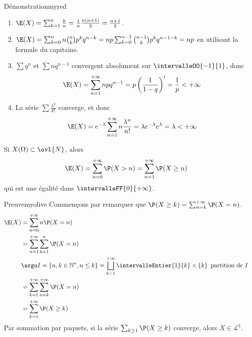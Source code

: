     \begin{omed}{Démonstration}{myred}
        \begin{enumerate}
            \item $\E(X) = \sum_{k=1}^n \frac{k}{n} = \frac{1}{n} \frac{n(n+1)}{2} = \frac{n+1}{2}$.
            \item $\E(X) = \sum_{k=0}^n n \binom{n}{k} p^k q^{n-k} = np \sum_{k=0}^{n-1} \binom{n-1}{k} p^k q^{n-1-k} = np$ en utilisant la formule du capitaine.
            \item $\sum q^n$ et $\sum n q^{n-1}$ convergent absolument sur $\intervalleOO{-1}{1}$, donc 
            \[ \E(X) = \sum_{n=1}^{+\infty} n p q^{n-1} = p \left(\frac{1}{1-q}\right)' = \frac{1}{p} < +\infty \]   
            \item La série $\sum \frac{\lambda^k}{k!}$ converge, et donc 
            \[ \E(X) = e^{-\lambda} \sum_{n=1}^{+\infty} n \frac{\lambda^n}{n!} = \lambda e^{-\lambda} e^{\lambda} = \lambda < +\infty \]   
        \end{enumerate}
    \end{omed}

    \begin{prop}{}{}
        Si $X(\Omega) \subset \ovl{N}$, alors
        \[ \E(X) = \sum_{n = 0}^{+\infty} \P(X > n) = \sum_{n=1}^{+\infty} \P(X \geq n) \]   
        qui est une égalité dans $\intervalleFF{0}{+\infty}$.
    \end{prop}

    \begin{demo}{Preuve}{myolive}
        Commençons par remarquer que $\P(X \geq k) = \sum_{n=k}^{+\infty} \P(X = n)$.
        \begin{align*}
            \E(X) 
            &= \sum_{n = 0}^{+\infty} n \P(X = n) \\
            &= \sum_{n = 1}^{+\infty} \sum_{k= 1}^n \P(X = n) \\
            &\argu I = \left\{n,k \in \mathbb{N}^*, n \leq k\right\} = \bigsqcup_{k=1}^{+\infty} \intervalleEntier{1}{k} \times \left\{k\right\} \text{ partition de } I \\
            &= \sum_{k = 1}^{+\infty} \sum_{n=k}^{+\infty} \P(X = n) \\
            &= \sum_{k= 1}^{+\infty} \P(X \geq k) 
        \end{align*}
        Par sommation par paquets, si la série $\sum_{k \geq 1} \P(X \geq k)$ converge, alors $X \in \mathcal{L}^1$.
    \end{demo}

